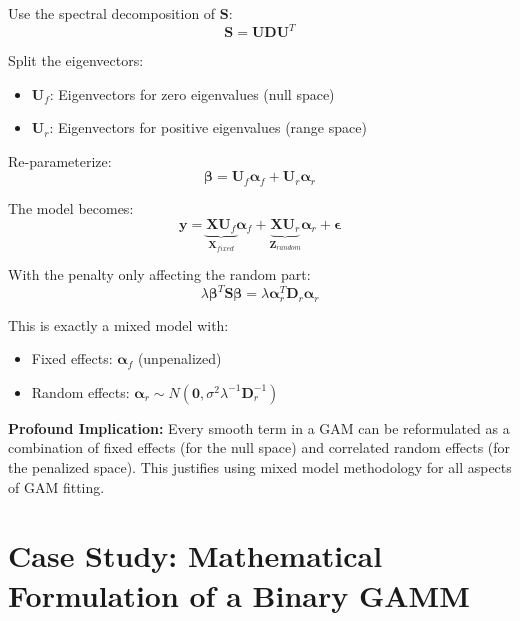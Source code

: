 \documentclass[12pt]{article}
\begin{document}
Use the spectral decomposition of $\mathbf{S}$:
\begin{equation*}
    \mathbf{S} = \mathbf{U}\mathbf{D}\mathbf{U}^T
\end{equation*}

Split the eigenvectors:
\begin{itemize}
    \item $\mathbf{U}_f$: Eigenvectors for zero eigenvalues (null space)
    \item $\mathbf{U}_r$: Eigenvectors for positive eigenvalues (range space)
\end{itemize}

Re-parameterize:
\begin{equation*}
    \boldsymbol{\beta} = \mathbf{U}_f\boldsymbol{\alpha}_f + \mathbf{U}_r\boldsymbol{\alpha}_r
\end{equation*}

The model becomes:
\begin{equation*}
    \mathbf{y} = \underbrace{\mathbf{X}\mathbf{U}_f}_{\mathbf{X}_{fixed}}\boldsymbol{\alpha}_f + \underbrace{\mathbf{X}\mathbf{U}_r}_{\mathbf{Z}_{random}}\boldsymbol{\alpha}_r + \boldsymbol{\epsilon}
\end{equation*}

With the penalty only affecting the random part:
\begin{equation*}
    \lambda \boldsymbol{\beta}^T \mathbf{S} \boldsymbol{\beta} = \lambda \boldsymbol{\alpha}_r^T \mathbf{D}_r \boldsymbol{\alpha}_r
\end{equation*}

This is exactly a mixed model with:
\begin{itemize}
    \item Fixed effects: $\boldsymbol{\alpha}_f$ (unpenalized)
    \item Random effects: $\boldsymbol{\alpha}_r \sim N(\mathbf{0}, \sigma^2 \lambda^{-1} \mathbf{D}_r^{-1})$
\end{itemize}

\textbf{Profound Implication:} Every smooth term in a GAM can be reformulated as a combination of fixed effects (for the null space) and correlated random effects (for the penalized space). This justifies using mixed model methodology for all aspects of GAM fitting.

\newpage
\section{Case Study: Mathematical Formulation of a Binary GAMM}
\end{document}
